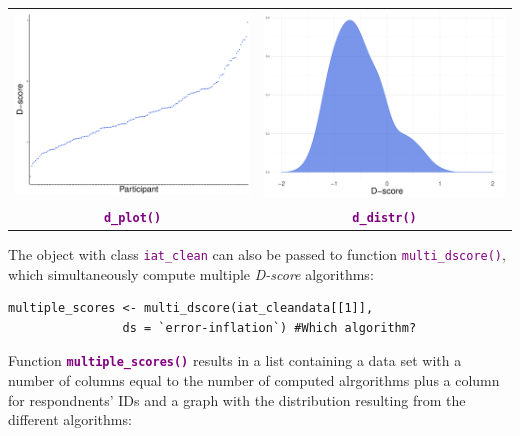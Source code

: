 \documentclass[a0,landscape]{a0poster}
\begin{document}
\begin{multicols*}{3}
		\vspace{.4cm}
\begin{tabular}{c c}
		\includegraphics[width=0.45\linewidth]{dplot.pdf}
	&
		\includegraphics[width=0.45\linewidth]{ddistr.pdf} \\
		\textbf{\textcolor{purple}{\texttt{d\_plot()}}} & \textbf{\textcolor{purple}{\texttt{d\_distr()}}}\\
\end{tabular}

\vspace{3mm}

The object with class \textcolor{purple}{\texttt{iat\_clean}} can also be passed to function \textcolor{purple}{\texttt{multi\_dscore()}}, which simultaneously compute multiple \emph{D-score} algorithms: 
\begin{lstlisting}
multiple_scores <- multi_dscore(iat_cleandata[[1]], 
	            ds = `error-inflation`) #Which algorithm?
\end{lstlisting}

Function \textbf{\textcolor{purple}{\texttt{multiple\_scores()}}} results in a list containing a data set with a number of columns equal to the number of computed alrgorithms plus a column for respondnents' IDs and a graph with the distribution resulting from the different algorithms: 


\end{multicols*}
\end{document}
